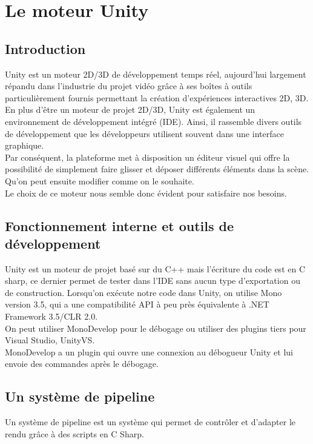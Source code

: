 \section{Le moteur Unity}
\subsection{\textbf{Introduction}}

Unity est un moteur 2D/3D de développement temps réel, aujourd’hui largement répandu dans l’industrie du projet vidéo grâce à ses boîtes à outils particulièrement fournis permettant la création d’expériences interactives 2D, 3D.\\
En plus d'être un moteur de projet 2D/3D, Unity est également un environnement de développement intégré (IDE). Ainsi, il rassemble divers outils de développement que les développeurs utilisent souvent dans une interface graphique.\\
Par conséquent, la plateforme met à disposition un éditeur visuel qui offre la possibilité de simplement faire glisser et déposer différents éléments dans la scène. Qu'on peut ensuite modifier comme on le souhaite.\\
Le choix de ce moteur nous semble donc évident pour satisfaire nos besoins.

\subsection{\textbf{Fonctionnement interne et outils de développement}}

Unity \cite{unity} est un moteur de projet basé sur du C++ mais l'écriture du code est en C sharp, ce dernier permet de tester dans l'IDE sans aucun type d'exportation ou de construction. Lorsqu'on exécute notre code dans Unity, on utilise Mono version 3.5, qui a une compatibilité API à peu près équivalente à .NET Framework 3.5/CLR 2.0.\\
On peut utiliser MonoDevelop pour le débogage ou utiliser des plugins tiers pour Visual Studio, UnityVS.\\
MonoDevelop a un plugin qui ouvre une connexion au débogueur Unity et lui envoie des commandes après le débogage.\\

\subsection{\textbf{Un système de pipeline}}

Un système de pipeline \cite{pipeline} est un système qui permet de contrôler et d'adapter le rendu grâce à des scripts en C Sharp.\\

